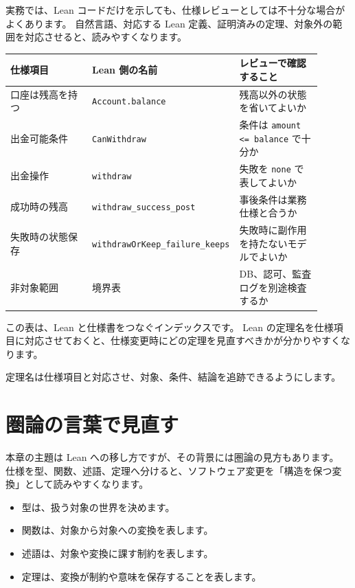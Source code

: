 実務では、Lean コードだけを示しても、仕様レビューとしては不十分な場合がよくあります。
自然言語、対応する Lean 定義、証明済みの定理、対象外の範囲を対応させると、読みやすくなります。

\begin{center}
\begin{tabular}{p{0.32\linewidth}p{0.28\linewidth}p{0.30\linewidth}}
\toprule
仕様項目 & Lean 側の名前 & レビューで確認すること \\
\midrule
口座は残高を持つ & \texttt{Account.balance} & 残高以外の状態を省いてよいか \\
出金可能条件 & \texttt{CanWithdraw} & 条件は \texttt{amount <= balance} で十分か \\
出金操作 & \texttt{withdraw} & 失敗を \texttt{none} で表してよいか \\
成功時の残高 & \texttt{withdraw\_success\_post} & 事後条件は業務仕様と合うか \\
失敗時の状態保存 & \texttt{withdrawOrKeep\_}\allowbreak\texttt{failure\_keeps} & 失敗時に副作用を持たないモデルでよいか \\
非対象範囲 & 境界表 & DB、認可、監査ログを別途検査するか \\
\bottomrule
\end{tabular}
\end{center}

この表は、Lean と仕様書をつなぐインデックスです。
Lean の定理名を仕様項目に対応させておくと、仕様変更時にどの定理を見直すべきかが分かりやすくなります。

定理名は仕様項目と対応させ、対象、条件、結論を追跡できるようにします。

\section{圏論の言葉で見直す}

本章の主題は Lean への移し方ですが、その背景には圏論の見方もあります。
仕様を型、関数、述語、定理へ分けると、ソフトウェア変更を「構造を保つ変換」として読みやすくなります。

\begin{itemize}
\item 型は、扱う対象の世界を決めます。
\item 関数は、対象から対象への変換を表します。
\item 述語は、対象や変換に課す制約を表します。
\item 定理は、変換が制約や意味を保存することを表します。
\end{itemize}

